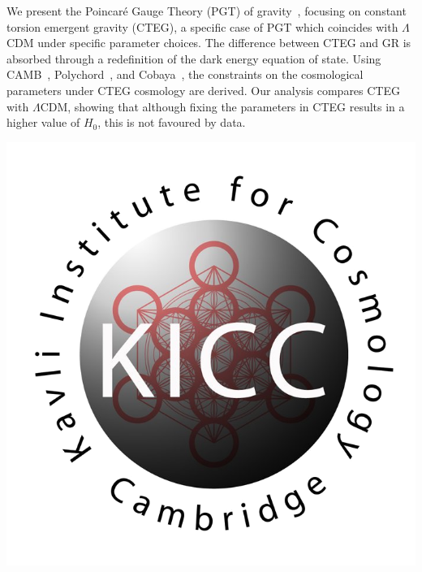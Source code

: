 \documentclass[25pt, a0paper, portrait]{tikzposter}
\begin{document}
{\begin{minipage}{0.53\textwidth}
We present the Poincaré Gauge Theory (PGT) of gravity~\cite{Barker:2020gcp, Barker:2020elg}, focusing on constant torsion emergent gravity (CTEG), a specific case of PGT which coincides with $\Lambda$CDM under specific parameter choices.
The difference between CTEG and GR is absorbed through a redefinition of the dark energy equation of state. Using CAMB~\cite{2011ascl.soft02026L}, Polychord~\cite{Handley_2015}, and Cobaya~\cite{Torrado_2021}, the constraints on the cosmological parameters under CTEG cosmology are derived. Our analysis compares CTEG with $\Lambda$CDM, showing that although fixing the parameters in CTEG results in a higher value of $H_0$, this is not favoured by data.
\end{minipage}
\begin{minipage}{0.1\textwidth}
    \begin{tikzfigure}
    \includegraphics[width = \textwidth]{kicc.png}
\end{tikzfigure}
\end{minipage}
}
\end{document}
